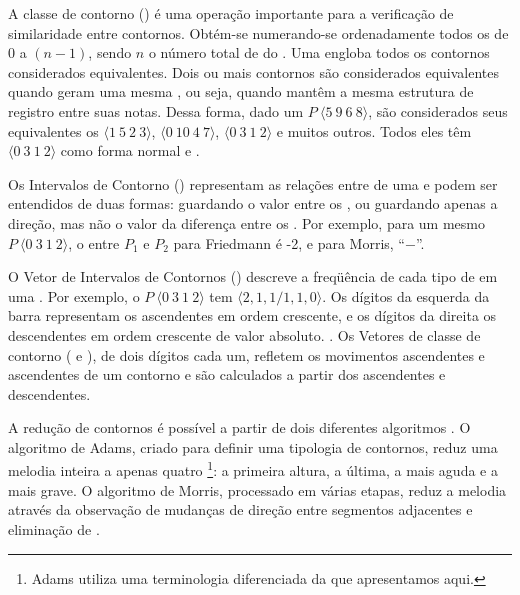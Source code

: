 A classe de contorno () é uma operação importante para a
verificação de similaridade entre contornos. Obtém-se 
numerando-se ordenadamente todos os  de $0$ a $(n-1)$,
sendo $n$ o número total de  do . Uma
 engloba todos os contornos considerados equivalentes. Dois
ou mais contornos são considerados equivalentes quando geram uma mesma
, ou seja, quando mantêm a mesma estrutura de
registro entre suas notas. Dessa forma, dado um 
$P\:\langle5\:9\:6\:8\rangle$, são considerados seus equivalentes os
 $\langle1\:5\:2\:3\rangle$, $\langle0\:10\:4\:7\rangle$,
$\langle0\:3\:1\:2\rangle$ e muitos outros. Todos eles têm
$\langle0\:3\:1\:2\rangle$ como forma normal e .

Os Intervalos de Contorno () representam as relações entre
 de uma  e podem ser entendidos de duas
formas: guardando o valor entre os 
\cite{friedmann85:methodology}, ou guardando apenas a direção, mas não
o valor da diferença entre os 
\cite{morris93:directions}. Por exemplo, para um mesmo 
$P\:\langle0\:3\:1\:2\rangle$, o  entre $P_1$ e $P_2$ para
Friedmann é -2, e para Morris, ``$-$''.

O Vetor de Intervalos de Contornos () descreve a freqüência
de cada tipo de  em uma . Por exemplo, o
 $P\:\langle0\:3\:1\:2\rangle$ tem 
$\langle2,1,1/1,1,0\rangle$. Os dígitos da esquerda da barra
representam os  ascendentes em ordem crescente, e os dígitos
da direita os  descendentes em ordem crescente de valor
absoluto. \cite{friedmann85:methodology}. Os Vetores de classe de
contorno ( e ), de dois dígitos cada um,
refletem os movimentos ascendentes e ascendentes de um contorno e são
calculados a partir dos  ascendentes e descendentes.

A redução de contornos é possível a partir de dois diferentes
algoritmos \cite{adams76:melodic,morris93:directions}. O algoritmo de
Adams, criado para definir uma tipologia de contornos, reduz uma
melodia inteira a apenas quatro \footnote{Adams utiliza
  uma terminologia diferenciada da que apresentamos aqui.}: a primeira
altura, a última, a mais aguda e a mais grave. O algoritmo de Morris,
processado em várias etapas, reduz a melodia através da observação de
mudanças de direção entre segmentos adjacentes e eliminação de
.

